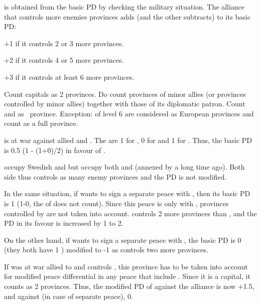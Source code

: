  is obtained from the basic PD by
checking the military situation.
\bparag The alliance that controls more enemies provinces adds (and the other
subtracts) to its basic PD:
\begin{modlist}
  \item[+1] if it controls 2 or 3 more provinces.
  \item[+2] if it controls 4 or 5 more provinces.
  \item[+3] if it controls at least 6 more provinces.
\end{modlist}
\bparag Count capitals as 2 provinces.
\bparag Do count provinces of minor allies (or provinces controlled by minor
allies) together with those of its diplomatic patron.
\bparag Count \COL and \TP as \undemi\ province. Exception: \COL of level
6 are considered as European provinces and count as a full province.

\begin{exemple}
  \RUS is at war against allied \TUR and \SUE. The \STAB are 1 for \RUS, 0 for
  \SUE and 1 for \TUR. Thus, the basic PD is 0.5 (1 - (1+0)/2) in favour of
  \RUS.

  \RUS occupy Swedish \provinceNeva and \provinceKarelen but \TUR occupy both
  \provinceAstragan and \provinceTerek (annexed by \RUS a long time
  ago). Both side thus controls as many enemy provinces and the PD is not
  modified.
\end{exemple}

\begin{exemple}
  In the same situation, if \RUS wants to sign a separate peace with \SUE,
  then its basic PD is 1 (1-0, the \STAB of \TUR does not count). Since this
  peace is only with \SUE, provinces controlled by \TUR are not taken into
  account. \RUS controls 2 more provinces than \SUE, and the PD in its favour
  is increased by 1 to 2.

  On the other hand, if \RUS wants to sign a separate peace with \TUR, the
  basic PD is 0 (they both have 1 \STAB) modified to -1 as \TUR controls two
  more provinces.
\end{exemple}

\begin{exemple}
  If \paysCrimee was at war allied to \TUR and \RUS controls \provinceCrimee,
  this province has to be taken into account for modified peace differential
  in any peace that include \TUR. Since it is a capital, it counts as 2
  provinces. Thus, the modified PD of \RUS against the alliance is now +1.5,
  and against \TUR (in case of separate peace), 0.
\end{exemple}

